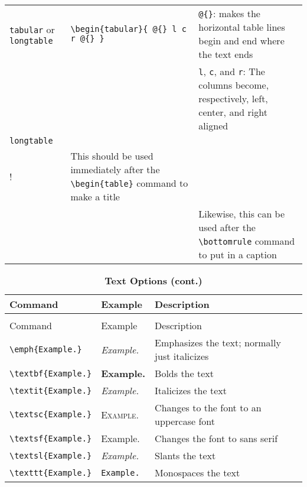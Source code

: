 \documentclass[10pt,letterpaper,landscape]{article}	%
\newcommand{\tabletitle}[1]{{\textbf{\large{#1}}}}
\begin{document}
\begin{longtable}{ @{} l l l @{} }
\lstinline!tabular! or \lstinline!longtable! & \lstinline!\begin{tabular}{ @{} l c r @{} }! & \lstinline!@{}!: makes the horizontal table lines begin and end where the text ends \\
&& \lstinline!l!, \lstinline!c!, and \lstinline!r!: The columns become, respectively, left, center, and right aligned \\
\lstinline!longtable! & \lstinline!\caption{...}\\! & This should be used immediately after the \lstinline!\begin{table}! command to make a title \\
&& Likewise, this can be used after the \lstinline!\bottomrule! command to put in a caption \\
\bottomrule
\end{longtable}

\begin{longtable}{ @{} l l l @{} }
\caption{\tabletitle{Text Options}} \\ \toprule
Command & Example & Description \\ \midrule
\endfirsthead
\caption{\tabletitle{Text Options (cont.)}} \\ \toprule
Command & Example & Description \\ \midrule
\endhead
\lstinline!\emph{Example.}! & \emph{Example.} & Emphasizes the text; normally just italicizes \\
\lstinline!\textbf{Example.}! & \textbf{Example.} & Bolds the text \\
\lstinline!\textit{Example.}! & \textit{Example.} & Italicizes the text \\
\lstinline!\textsc{Example.}! & \textsc{Example.} & Changes to the font to an uppercase font \\
\lstinline!\textsf{Example.}! & \textsf{Example.} & Changes the font to sans serif \\
\lstinline!\textsl{Example.}! & \textsl{Example.} & Slants the text \\
\lstinline!\texttt{Example.}! & \texttt{Example.} & Monospaces the text \\
\bottomrule
\end{longtable}
\end{document}

